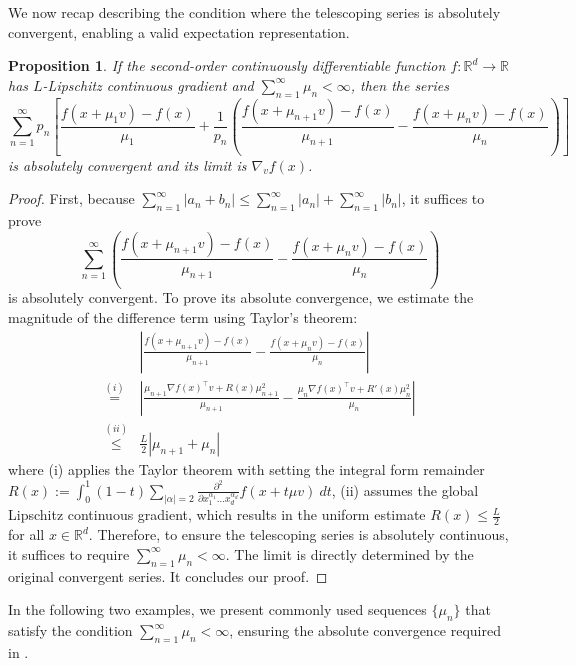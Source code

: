 \documentclass{article}
\newcommand{\RR}{\mathbb{R}}
\theoremstyle{definition}
\theoremstyle{plain}
\newtheorem{proposition}[definition]{Proposition}
\theoremstyle{remark}
\begin{document}
We now recap  describing the condition where the telescoping series is absolutely convergent, enabling a valid expectation representation.
\begin{proposition}\label{prop:abs-conv-appendix}
If the second-order continuously differentiable function $f:\RR^d \to \RR$ has $L$-Lipschitz continuous gradient and $\sum_{n=1}^\infty \mu_n < \infty$, then the series $$\sum_{n=1}^\infty p_n\left[\frac{f(x+\mu_1 v) - f(x)}{\mu_1} + \frac{1}{p_n}\left( \frac{f(x+\mu_{n+1} v) - f(x)}{\mu_{n+1}} - \frac{f(x+\mu_n v) - f(x)}{\mu_n}\right) \right]$$ is absolutely convergent and its limit is $\nabla_v f(x)$.
\end{proposition}
\begin{proof}  First, because $\sum_{n=1}^\infty |a_n+b_n| \leq \sum_{n=1}^\infty |a_n | +\sum_{n=1}^\infty |b_n |$, it suffices to prove $$\sum_{n=1}^\infty  \left( \frac{f(x+\mu_{n+1} v) - f(x)}{\mu_{n+1}} - \frac{f(x+\mu_n v) - f(x)}{\mu_n}\right)  $$ is absolutely convergent. To prove its absolute convergence, we estimate the magnitude of the difference term using Taylor’s theorem: 
    \begin{align*}
        &\left| \frac{f(x+\mu_{n+1} v)-f(x)}{\mu_{n+1}}-\frac{f(x+\mu_n v)-f(x)}{\mu_n}\right| \\
        \overset{(i)}{=} & \left| \frac{ \mu_{n+1}\nabla f(x)^\top v  + R(x) \mu_{n+1}^2}{ \mu_{n+1}} - \frac{ \mu_{n}\nabla f(x)^\top v  + R'(x) \mu_{n}^2}{ \mu_{n}}\right| \\ 
        \overset{(ii)}{\leq} & \frac{L}{2}\left|   \mu_{n+1}  +  \mu_{n} \right|
    \end{align*} 
    where (i) applies the Taylor theorem \citep{Folland_Taylor2024} with setting the integral form remainder $R(x):=\int_0^1 (1-t) \sum_{|\alpha|=2} \frac{\partial^2}{\partial x_1^{\alpha_1}\dots x_d^{\alpha_d}}   f(x+t\mu v) \ dt$, (ii) assumes the global Lipschitz continuous gradient, which results in the uniform estimate
    $R(x) \leq \frac{L}{2}$
    for all $x \in \RR^d$.  Therefore, to ensure the telescoping series is absolutely continuous, it suffices to require $\sum_{n=1}^\infty \mu_n < \infty.$  
    The limit is directly determined by the original convergent series. It concludes our proof. 
\end{proof} 

In the following two examples, we present commonly used sequences \( \{\mu_n\} \) that satisfy the condition \( \sum_{n=1}^\infty \mu_n < \infty \), ensuring the absolute convergence required in .
\end{document}
